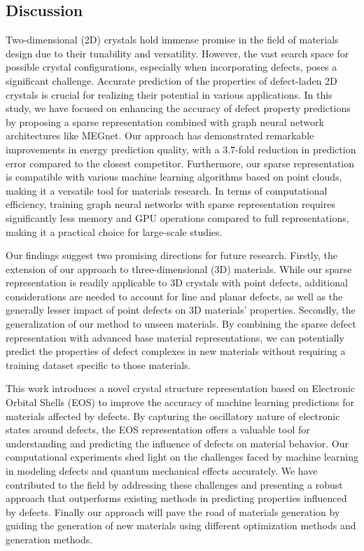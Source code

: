 \subsection{Discussion}
\label{sec:conclusion}
    Two-dimensional (2D) crystals hold immense promise in the field of materials design due to their tunability and versatility. However, the vast search space for possible crystal configurations, especially when incorporating defects, poses a significant challenge. Accurate prediction of the properties of defect-laden 2D crystals is crucial for realizing their potential in various applications. In this study, we have focused on enhancing the accuracy of defect property predictions by proposing a sparse representation combined with graph neural network architectures like MEGnet. Our approach has demonstrated remarkable improvements in energy prediction quality, with a 3.7-fold reduction in prediction error compared to the closest competitor. Furthermore, our sparse representation is compatible with various machine learning algorithms based on point clouds, making it a versatile tool for materials research. In terms of computational efficiency, training graph neural networks with sparse representation requires significantly less memory and GPU operations compared to full representations, making it a practical choice for large-scale studies.
    
    Our findings suggest two promising directions for future research. Firstly, the extension of our approach to three-dimensional (3D) materials. While our sparse representation is readily applicable to 3D crystals with point defects, additional considerations are needed to account for line and planar defects, as well as the generally lesser impact of point defects on 3D materials' properties. Secondly, the generalization of our method to unseen materials. By combining the sparse defect representation with advanced base material representations, we can potentially predict the properties of defect complexes in new materials without requiring a training dataset specific to those materials.
    
    This work introduces a novel crystal structure representation based on Electronic Orbital Shells (EOS) to improve the accuracy of machine learning predictions for materials affected by defects. By capturing the oscillatory nature of electronic states around defects, the EOS representation offers a valuable tool for understanding and predicting the influence of defects on material behavior. Our computational experiments shed light on the challenges faced by machine learning in modeling defects and quantum mechanical effects accurately. We have contributed to the field by addressing these challenges and presenting a robust approach that outperforms existing methods in predicting properties influenced by defects. Finally our approach will pave the road of materials generation by guiding the generation of new materials using different optimization methods and generation methods.
    


